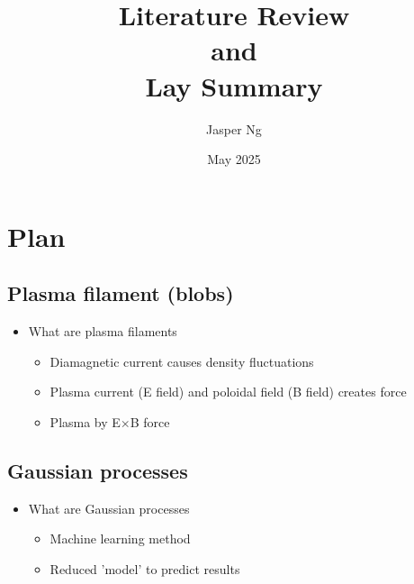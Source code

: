 \documentclass{article}
\title{\textbf{Literature Review \\and \\Lay Summary}}
\author{Jasper Ng}
\date{May 2025}
\begin{document}
\maketitle

\section*{Plan}
\subsection*{Plasma filament (blobs)}
\begin{itemize}
    \item What are plasma filaments \cite{omotani_effects_2015}
    \begin{itemize}
        \item Diamagnetic current causes density fluctuations
        \item Plasma current (E field) and poloidal field (B field) creates force
        \item Plasma by E$\times$B force
        
    \end{itemize}
\end{itemize}

\subsection*{Gaussian processes} 
\begin{itemize}
    \item What are Gaussian processes \cite{hornsby_gaussian_2024}
    \begin{itemize}    
        \item Machine learning method
        \item Reduced 'model' to predict results
    \end{itemize}
\end{itemize}

\nocite{*}
\printbibliography[title={References}]
\end{document}
